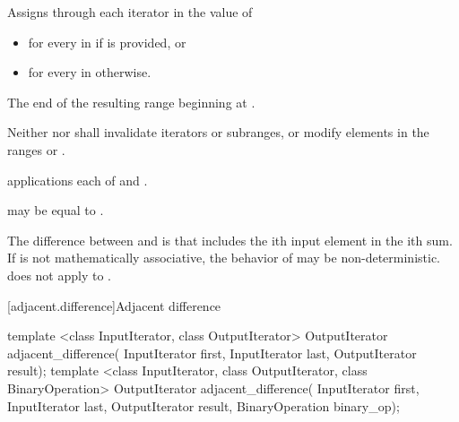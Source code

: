 \begin{itemdescr}
\pnum
\effects
Assigns through each iterator  in  the value of
\begin{itemize}
\item
{}
for every  in 
if  is provided, or
\item
{}
for every  in  otherwise.
\end{itemize}

\pnum
\returns
The end of the resulting range beginning at .

\pnum
\requires
Neither  nor  shall invalidate iterators or
subranges, or modify elements in the ranges  or
.

\pnum
\complexity
{} applications each of  and
.

\pnum
\remarks
{} may be equal to .

\pnum
\realnotes
The difference between  and
 is that 
includes the ith input element in the ith sum. If  is not
mathematically associative, the behavior of 
may be non-deterministic.  does not apply
 to .
\end{itemdescr}

[adjacent.difference]{Adjacent difference}

%
\begin{itemdecl}
template <class InputIterator, class OutputIterator>
  OutputIterator adjacent_difference(
    InputIterator first, InputIterator last,
    OutputIterator result);
template <class InputIterator, class OutputIterator, class BinaryOperation>
  OutputIterator adjacent_difference(
    InputIterator first, InputIterator last,
    OutputIterator result,
    BinaryOperation binary_op);
\end{itemdecl}

